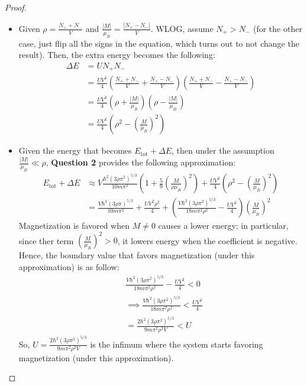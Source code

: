 \documentclass{article}
\begin{document}
\begin{proof}

    \hfil

    \begin{itemize}
        \item[(a)] Given $\rho=\frac{N_++N_-}{V}$ and $\frac{|M|}{\mu_B}=\frac{|N_+-N_-|}{V}$. WLOG, assume $N_+>N_-$ (for the other case, just flip all the signs in the equation, which turns out to not change the result). Then, the extra energy becomes the following:
        \begin{align}
            \Delta E &= U N_+ N_-\\ 
            &= \frac{UV^2}{4} \left(\frac{N_++N_-}{V}+\frac{N_+-N_-}{V}\right)\left(\frac{N_++N_-}{V}-\frac{N_+-N_-}{V}\right)\\
            &= \frac{UV^2}{4}\left(\rho+\frac{|M|}{\mu_B}\right)\left(\rho-\frac{|M|}{\mu_B}\right)\\
            &= \frac{UV^2}{4}\left(\rho^2-\left(\frac{M}{\mu_B}\right)^2\right)
        \end{align}
        
        \hfil

        \item[(b)] Given the energy that becomes $E_\text{tot}+\Delta E$, then under the assumption $\frac{|M|}{\mu_B}\ll \rho$, \textbf{Question 2} provides the following approximation:
        \begin{align}
            E_\text{tot}+\Delta E &\approx V\frac{\hbar^2(3\rho\pi^2)^{5/3}}{10m\pi^2}\left(1+\frac{5}{9}\left(\frac{M}{\rho \mu_B}\right)^2\right) + \frac{UV^2}{4}\left(\rho^2-\left(\frac{M}{\mu_B}\right)^2\right)\\
            &= \frac{V\hbar^2(3\rho\pi)^{5/3}}{10m\pi^2}+\frac{UV^2\rho^2}{4} + \left(\frac{V\hbar^2(3\rho\pi^2)^{5/3}}{18m\pi^2\rho^2}-\frac{UV^2}{4}\right)\left(\frac{M}{\mu_B}\right)^2
        \end{align}
        Magnetization is favored when $M\neq 0$ causes a lower energy; in particular, since ther term $\left(\frac{M}{\mu_B}\right)^2>0$, it lowers energy when the coefficient is negative. Hence, the boundary value that favors magnetization (under this approximation) is as follow:
        \begin{align}
            &\frac{V\hbar^2(3\rho\pi^2)^{5/3}}{18m\pi^2\rho^2}-\frac{UV^2}{4}<0\\
            &\implies \frac{V\hbar^2(3\rho\pi^2)^{5/3}}{18m\pi^2\rho^2}<\frac{UV^2}{4}\\
            &= \frac{2\hbar^2(3\rho\pi^2)^{5/3}}{9m\pi^2\rho^2V}<U
        \end{align}
        So, $U=\frac{2\hbar^2(3\rho\pi^2)^{5/3}}{9m\pi^2\rho^2V}$ is the infimum where the system starts favoring magnetization (under this approximation).
    \end{itemize}
\end{proof}
\end{document}
